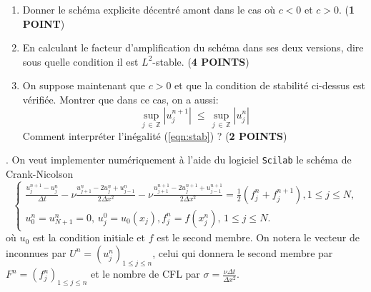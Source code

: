 \documentclass[12pt,a4paper]{article}
\begin{document}
\begin{enumerate}
\item Donner le sch\'ema explicite d\'ecentr\'e amont dans le cas o\`u $c<0$ et
  $c>0$. ({\bf 1 POINT})
\vspace{3cm}
\item  En calculant le facteur d'amplification du sch\'ema dans ses
  deux versions, dire sous quelle condition il est $\displaystyle
  L^2$-stable. ({\bf 4 POINTS})
\newpage
\item On suppose maintenant que $c>0$ et que la  condition de stabilit\'e ci-dessus est v\'erifi\'ee.  Montrer que dans ce cas, on a aussi:
\begin{equation} \label{eqn:stab}
\sup_{j \, \in \, \mathbb{Z}} \left|  u_j^{n+1} \right| \; \le \, \sup_{j \, \in \, \mathbb{Z}} \left|  u_j^{n} \right| 
\end{equation}
Comment interpr\'eter l'in\'egalit\'e (\ref{eqn:stab})  ? ({\bf 2 POINTS})
\end{enumerate}
\vspace{9cm}
. On veut implementer num\'eriquement \`a
l'aide du logiciel \texttt{Scilab} le {sch\'ema} de Crank-Nicolson
$$
\left\{\begin{array}{l}
\displaystyle\frac{u_j^{n+1}-u_j^n}{\Delta t}-\nu
\frac{u_{j+1}^{n}-2u_j^n+u_{j-1}^{n}}{2\Delta x^2}-\nu
\frac{u_{j+1}^{n+1}-2u_j^{n+1}+u_{j-1}^{n+1}}{2\Delta x^2}=\frac{1}{2}(f^n_j+f^{n+1}_j), 1\le j
\le N,\\[2ex]
\displaystyle u^n_0=u^n_{N+1}=0,\, u_j^0=u_0(x_j), f^n_j = f(x_j^n),\, 1\le j \le N.
\end{array}\right.
$$
o\`u $u_0$ est la condition initiale et $f$ est le second membre.  On notera le vecteur de
inconnues par $U^n=(u^n_j)_{1\le
  j\le n}$, celui qui donnera le second membre par $F^n=(f^n_j)_{1\le
  j\le n}$ et le nombre de CFL par $\sigma=\frac{\nu\Delta t}{\Delta x^2}$.
\end{document}
